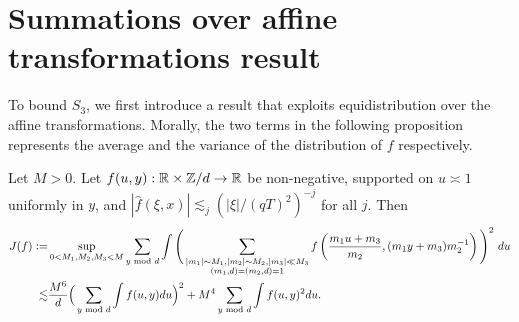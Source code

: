 \section{Summations over affine transformations result}
To bound $S_3$, we first introduce a result that exploits equidistribution over the affine transformations. Morally, the two terms in the following proposition represents the average and the variance of the distribution of $f$ respectively.

\iffalse
\begin{proposition}[Refinement of $S_3$]
    \label{refinements_3}
    We have \[
    S_3\lesssim \phi(q)^{7/2}T^2|\mathcal{S}|^{3/2}+\phi(q)^{3}\frac{NT}{q}|\mathcal{S}|^{1/2}E(\mathcal{S})^{1/2}.
     \]
\end{proposition}
The refinement of the previous bound relies on the result for summation over affine transformation by Guth and Maynard.
\begin{lemma} \label{affineGM}
    Let $M>0$. Let $f(u)\geq 0$, supported on $u\asymp 1$, and $|\hat{f}(\xi)|\lesssim_j ((1+|\xi|)/T)^{-j}$ for all $j\in \mathbb{N}$. Then \[
        \sup_{0<M_1,M_2,M_3<M} \int\Bigg( \sum_{\substack{|m_1|\sim M_1\\|m_2|\sim M_2 \\ |m_3|\ll M_3}} f\left(\frac{m_1 u+m_3}{m_2}\right)\Bigg)^2 \ du \lesssim M^6 \|f\|_{L_1}^2+M^4\|f\|_{L_2}^2.
    \] 
\end{lemma}
This is Proposition 9.1 from [GM]. The reduction in \[
\sum_{\substack{y_1,y_2 \in\mathbb{Z}/q\mathbb{Z} }}\int_{v_1\asymp 1}\Big[\sum_{\substack{|m_1|\sim M_1,|m_2|,|m_3|\sim M\\ y_1m_1+y_2m_2+m_3\equiv 0 \mod q_0}}\Big|\tilde{R}_M\left(\frac{m_1v_1+m_3}{-m_2v_1},y_2,y_1\right)\Big|^2\Big]^2dv_1\]
is somewhat lossy, so we aim to refine this bound in this section.
In principle, the condition $y_1m_1+y_2m_2+m_3\equiv 0$ fixes the residue class of $m_3$ based on $m_1$ and $m_2$. Therefore, we would expect a factor of $1/q^2$ if we add this summation condition to Proposition \ref{affineGM}. 
\fi
\begin{proposition}\label{affinetrans}
    Let $M>0$. Let $f(u,y):\mathbb{R}\times \mathbb{Z}/d \to \mathbb{R}$ be non-negative, supported on $u\asymp 1$ uniformly in $y$, and $|\hat{f}(\xi,x)|\lesssim_j (|\xi|/(qT)^2)^{-j}$ for all $j$. Then \begin{align*}
        J(f)\mathrel{\mathop:}= &\sup_{0<M_1,M_2,M_3<M}\sum_{y \textrm{ mod } d} \int\Bigg( \sum_{\substack{|m_1|\sim M_1,|m_2|\sim M_2 , |m_3|\ll M_3\\ (m_1,d)=(m_2,d)=1}} f\left(\frac{m_1 u+m_3}{m_2},(m_1 y+m_3)m_2^{-1}\right)\Bigg)^2 \ du\\
        \lesssim&\frac{M^6}{d}\Big(\sum_{y \textrm{ mod } d } \int f(u,y) du\Big)^2+{M^4}\sum_{y\textrm{ mod } d} \int f(u,y)^2 du.
    \end{align*}
\end{proposition}

